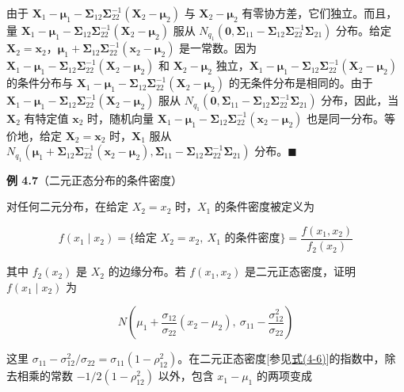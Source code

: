 由于 $\mathbf{X}_1-\boldsymbol{\mu}_1-\boldsymbol{\Sigma}_{12}\boldsymbol{\Sigma}_{22}^{-1}(\mathbf{X}_2-\boldsymbol{\mu}_2)$ 与 $\mathbf{X}_2-\boldsymbol{\mu}_2$ 有零协方差，它们独立。而且，量 $\mathbf{X}_1-\boldsymbol{\mu}_1-\boldsymbol{\Sigma}_{12}\boldsymbol{\Sigma}_{22}^{-1}(\mathbf{X}_2-\boldsymbol{\mu}_2)$ 服从 $N_{q_1}(\mathbf{0},\boldsymbol{\Sigma}_{11}-\boldsymbol{\Sigma}_{12}\boldsymbol{\Sigma}_{22}^{-1}\boldsymbol{\Sigma}_{21})$ 分布。给定 $\mathbf{X}_2=\mathbf{x}_2$，$\boldsymbol{\mu}_1+\boldsymbol{\Sigma}_{12}\boldsymbol{\Sigma}_{22}^{-1}(\mathbf{x}_2-\boldsymbol{\mu}_2)$ 是一常数。因为 $\mathbf{X}_1-\boldsymbol{\mu}_1-\boldsymbol{\Sigma}_{12}\boldsymbol{\Sigma}_{22}^{-1}(\mathbf{X}_2-\boldsymbol{\mu}_2)$ 和 $\mathbf{X}_2-\boldsymbol{\mu}_2$ 独立，$\mathbf{X}_1-\boldsymbol{\mu}_1-\boldsymbol{\Sigma}_{12}\boldsymbol{\Sigma}_{22}^{-1}(\mathbf{X}_2-\boldsymbol{\mu}_2)$ 的条件分布与 $\mathbf{X}_1-\boldsymbol{\mu}_1-\boldsymbol{\Sigma}_{12}\boldsymbol{\Sigma}_{22}^{-1}(\mathbf{X}_2-\boldsymbol{\mu}_2)$ 的无条件分布是相同的。由于 $\mathbf{X}_1-\boldsymbol{\mu}_1-\boldsymbol{\Sigma}_{12}\boldsymbol{\Sigma}_{22}^{-1}(\mathbf{X}_2-\boldsymbol{\mu}_2)$ 服从 $N_{q_1}(\mathbf{0},\boldsymbol{\Sigma}_{11}-\boldsymbol{\Sigma}_{12}\boldsymbol{\Sigma}_{22}^{-1}\boldsymbol{\Sigma}_{21})$ 分布，因此，当 $\mathbf{X}_2$ 有特定值 $\mathbf{x}_2$ 时，随机向量 $\mathbf{X}_1-\boldsymbol{\mu}_1-\boldsymbol{\Sigma}_{12}\boldsymbol{\Sigma}_{22}^{-1}(\mathbf{x}_2-\boldsymbol{\mu}_2)$ 也是同一分布。等价地，给定 $\mathbf{X}_2=\mathbf{x}_2$ 时，$\mathbf{X}_1$ 服从 $N_{q_1}(\boldsymbol{\mu}_1+\boldsymbol{\Sigma}_{12}\boldsymbol{\Sigma}_{22}^{-1}(\mathbf{x}_2-\boldsymbol{\mu}_2),\boldsymbol{\Sigma}_{11}-\boldsymbol{\Sigma}_{12}\boldsymbol{\Sigma}_{22}^{-1}\boldsymbol{\Sigma}_{21})$ 分布。\hfill$\blacksquare$

\noindent\textbf{例 4.7}\quad （二元正态分布的条件密度）

对任何二元分布，在给定 $X_2=x_2$ 时，$X_1$ 的条件密度被定义为

\[
f(x_1\mid x_2)=\{\text{给定 }X_2=x_2,\ X_1 \text{ 的条件密度}\}=\frac{f(x_1,x_2)}{f_2(x_2)}
\]

其中 $f_2(x_2)$ 是 $X_2$ 的边缘分布。若 $f(x_1,x_2)$ 是二元正态密度，证明 $f(x_1\mid x_2)$ 为

\[
N\left(\mu_1+\frac{\sigma_{12}}{\sigma_{22}}(x_2-\mu_2),\ \sigma_{11}-\frac{\sigma_{12}^2}{\sigma_{22}}\right)
\]

这里 $\sigma_{11}-\sigma_{12}^2/\sigma_{22}=\sigma_{11}(1-\rho_{12}^2)$。在二元正态密度[参见\hyperref[eq:4-6]{式(4-6)}]的指数中，除去相乘的常数 $-1/2(1-\rho_{12}^2)$ 以外，包含 $x_1-\mu_1$ 的两项变成
